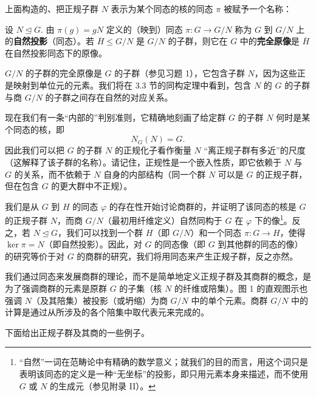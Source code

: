 上面构造的、把正规子群 \(N\) 表示为某个同态的核的同态 \(\pi\) 被赋予一个名称：

\begin{definition}
设 \(N \trianglelefteq G\). 由 \(\pi(g) = gN\) 定义的（映到）同态 \(\pi : G \to G/N\) 称为 \(G\) 到 \(G/N\) 上的\textbf{自然投影}（同态）。若 \(\overline{H} \leq G/N\) 是 \(G/N\) 的子群，则它在 \(G\) 中的\textbf{完全原像}是 \(\overline{H}\) 在自然投影同态下的原像。
\end{definition}

\(G/N\) 的子群的完全原像是 \(G\) 的子群（参见习题 1），它包含子群 \(N\)，因为这些正是映射到单位元的元素。我们将在 3.3 节的同构定理中看到，包含 \(N\) 的 \(G\) 的子群与商 \(G/N\) 的子群之间存在自然的对应关系。

现在我们有一条“内部的”判别准则，它精确地刻画了给定群 \(G\) 的子群 \(N\) 何时是某个同态的核，即
\[
N_G(N) = G.
\]
因此我们可以把 \(G\) 的子群 \(N\) 的正规化子看作衡量 \(N\) “离正规子群有多近”的尺度（这解释了该子群的名称）。请记住，正规性是一个嵌入性质，即它依赖于 \(N\) 与 \(G\) 的关系，而不依赖于 \(N\) 自身的内部结构（同一个群 \(N\) 可以是 \(G\) 的正规子群，但在包含 \(G\) 的更大群中不正规）。

我们是从 \(G\) 到 \(H\) 的同态 \(\varphi\) 的存在性开始讨论商群的，并证明了该同态的核是 \(G\) 的正规子群 \(N\)，而商 \(G/N\)（最初用纤维定义）自然同构于 \(G\) 在 \(\varphi\) 下的像\footnote{“自然”一词在范畴论中有精确的数学意义；就我们的目的而言，用这个词只是表明该同态的定义是一种“无坐标”的投影，即只用元素本身来描述，而不使用 \(G\) 或 \(N\) 的生成元（参见附录 II）。}。反之，若 \(N \trianglelefteq G\)，我们可以找到一个群 \(H\)（即 \(G/N\)）和一个同态 \(\pi : G \to H\)，使得 \(\ker \pi = N\)（即自然投影）。因此，对 \(G\) 的同态像（即 \(G\) 到其他群的同态的像）的研究等价于对 \(G\) 的商群的研究，我们将用同态来产生正规子群，反之亦然。

我们通过同态来发展商群的理论，而不是简单地定义正规子群及其商群的概念，是为了强调商群的元素是原群 \(G\) 的子集（核 \(N\) 的纤维或陪集）。图 1 的直观图示也强调 \(N\)（及其陪集）被投影（或坍缩）为商 \(G/N\) 中的单个元素。商群 \(G/N\) 中的计算是通过从所涉及的各个陪集中取代表元来完成的。

下面给出正规子群及其商的一些例子。

